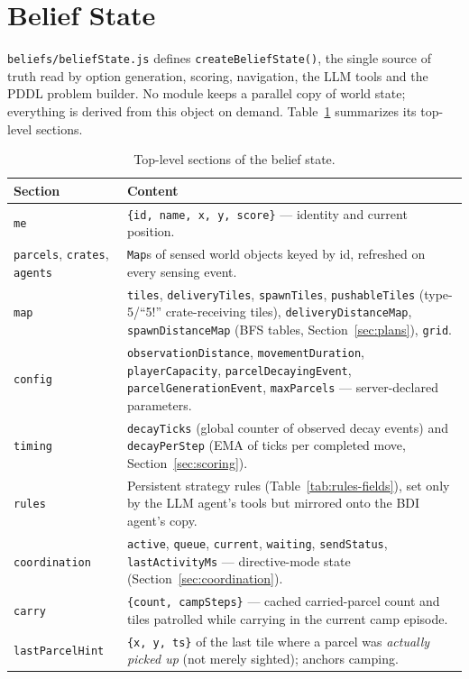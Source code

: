 \documentclass[11pt,a4paper]{article}
\begin{document}
\section{Belief State}
\label{sec:belief}

\texttt{beliefs/beliefState.js} defines \texttt{createBeliefState()}, the single source of
truth read by option generation, scoring, navigation, the LLM tools and the PDDL problem
builder. No module keeps a parallel copy of world state; everything is derived from this
object on demand. Table~\ref{tab:belief-fields} summarizes its top-level sections.

\begin{table}[htbp]
\centering
\footnotesize
\begin{tabular}{@{}p{2.6cm}p{9.4cm}@{}}
\toprule
\textbf{Section} & \textbf{Content} \\
\midrule
\texttt{me} & \texttt{\{id, name, x, y, score\}} --- identity and current position. \\
\texttt{parcels}, \texttt{crates}, \texttt{agents} & \texttt{Map}s of sensed world objects keyed by id, refreshed on every sensing event. \\
\texttt{map} & \texttt{tiles}, \texttt{deliveryTiles}, \texttt{spawnTiles}, \texttt{pushableTiles} (type-5/``5!'' crate-receiving tiles), \texttt{deliveryDistanceMap}, \texttt{spawnDistanceMap} (BFS tables, Section~\ref{sec:plans}), \texttt{grid}. \\
\texttt{config} & \texttt{observationDistance}, \texttt{movementDuration}, \texttt{playerCapacity}, \texttt{parcelDecayingEvent}, \texttt{parcelGenerationEvent}, \texttt{maxParcels} --- server-declared parameters. \\
\texttt{timing} & \texttt{decayTicks} (global counter of observed decay events) and \texttt{decayPerStep} (EMA of ticks per completed move, Section~\ref{sec:scoring}). \\
\texttt{rules} & Persistent strategy rules (Table~\ref{tab:rules-fields}), set only by the LLM agent's tools but mirrored onto the BDI agent's copy. \\
\texttt{coordination} & \texttt{active}, \texttt{queue}, \texttt{current}, \texttt{waiting}, \texttt{sendStatus}, \texttt{lastActivityMs} --- directive-mode state (Section~\ref{sec:coordination}). \\
\texttt{carry} & \texttt{\{count, campSteps\}} --- cached carried-parcel count and tiles patrolled while carrying in the current camp episode. \\
\texttt{lastParcelHint} & \texttt{\{x, y, ts\}} of the last tile where a parcel was \emph{actually picked up} (not merely sighted); anchors camping. \\
\bottomrule
\end{tabular}
\caption{Top-level sections of the belief state.}
\label{tab:belief-fields}
\end{table}
\end{document}
